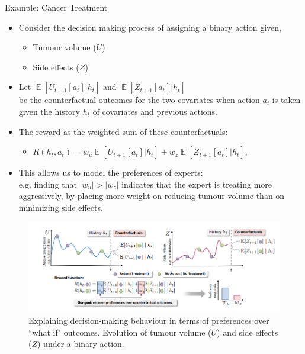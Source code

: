 \documentclass{beamer}
\DeclareMathOperator{\EX}{\mathbb{E}}%
\begin{document}
\begin{frame}{Example: Cancer Treatment}
    \begin{itemize}
        \item Consider the decision making process of assigning a binary action given, 
        \begin{itemize}
            \item Tumour volume ($U$)
            \item Side effects ($Z$) 
        \end{itemize}
    
        \item Let $\EX[U_{t+1}[a_t] | h_t]$ and $\EX[Z_{t+1}[a_t] | h_t]$    \\ 
        be the counterfactual outcomes for the two covariates when action $a_t$ is taken given the history $h_t$ of covariates and previous actions.  \\

        \item The reward as the weighted sum of these counterfactuals:
        \begin{itemize}
            \item $R(h_t, a_t) = w_u \EX[U_{t+1}[a_t] | h_t] + w_z \EX[Z_{t+1}[a_t] | h_t]$,
        \end{itemize}  

        \item This allows us to model the preferences of experts: \\
        e.g. finding that $|w_u| > |w_z|$ indicates that the expert is treating more aggressively, by placing more weight on reducing tumour volume than on minimizing side effects.

    \end{itemize}
        
\end{frame}

\begin{frame}{}
    \begin{figure}
        \centering
        \includegraphics[width=0.9\linewidth]{fig1.png}
        \caption{Explaining decision-making behaviour in terms of preferences over ``what if" outcomes. Evolution of tumour volume ($U$) and side effects ($Z$) under a binary action.}
        \label{fig1}
    \end{figure}
\end{frame}
\end{document}
